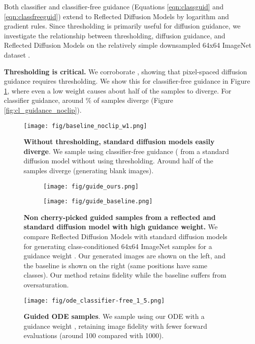 \documentclass{article}
\theoremstyle{plain}
\theoremstyle{definition}
\theoremstyle{remark}
\begin{document}
Both classifier and classifier-free guidance (Equations \ref{eqn:classguid} and \ref{eqn:classfreeguid}) extend to Reflected Diffusion Models by logarithm and gradient rules. Since thresholding is primarily useful for diffusion guidance, we investigate the relationship between thresholding, diffusion guidance, and Reflected Diffusion Models on the relatively simple downsampled 64x64 ImageNet dataset \citep{Russakovsky2014ImageNetLS}.

\textbf{Thresholding is critical.} We corroborate \citet{Saharia2022PhotorealisticTD}, showing that pixel-spaced diffusion guidance requires thresholding. We show this for classifier-free guidance in Figure \ref{fig:noclip}, where even a low weight  causes about half of the samples to diverge. For classifier guidance, around \% of samples diverge (Figure \ref{fig:cl_guidance_noclip}).

\begin{figure}[t]
    \centering
    \texttt{[image: fig/baseline\_noclip\_w1.png]}
    \caption{\textbf{Without thresholding, standard diffusion models easily diverge}. We sample using classifier-free guidance ( from a standard diffusion model without using thresholding. Around half of the samples diverge (generating blank images).}\label{fig:noclip}
    \vspace{-5mm}
\end{figure}

\begin{figure*}[!h]
    \centering
    \begin{subfigure}[b]{0.48\textwidth}
        \texttt{[image: fig/guide\_ours.png]}
    \end{subfigure}
    \hfill
    \begin{subfigure}[b]{0.48\textwidth}
        \texttt{[image: fig/guide\_baseline.png]}
    \end{subfigure}
    \caption{\textbf{Non cherry-picked guided samples from a reflected and standard diffusion model with high guidance weight.} We compare Reflected Diffusion Models with standard diffusion models for generating class-conditioned 64x64 ImageNet samples for a guidance weight . Our generated images are shown on the left, and the baseline is shown on the right (same positions have same classes). Our method retains fidelity while the baseline suffers from oversaturation.}\label{fig:diffguide}
\end{figure*}

\begin{figure}[!h]
    \centering
    \texttt{[image: fig/ode\_classifier-free\_1\_5.png]}
    \caption{\textbf{Guided ODE samples}. We sample using our ODE with a guidance weight , retaining image fidelity with fewer forward evaluations (around 100 compared with 1000).} \label{fig:odesample}
    \vspace{-5mm}
\end{figure}
\end{document}
